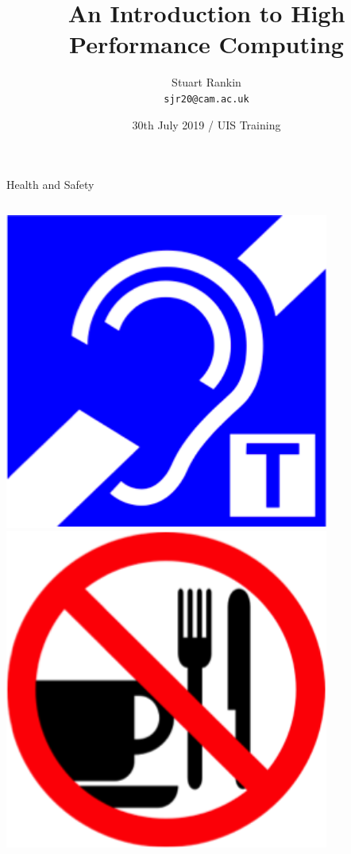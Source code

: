 \documentclass[handout]{beamer} %
\title[HPC: An introduction] %
{An Introduction to High Performance Computing}
\author[SJ Rankin] %
{Stuart Rankin\\ \texttt{sjr20@cam.ac.uk}}
\institute[Research Computing Services, University of Cambridge] %
{Research Computing Services (http://www.hpc.cam.ac.uk/)\\
University Information Services (http://www.uis.cam.ac.uk/)}
\date[30/07/2019] %
{30th July 2019 / UIS Training}
\begin{document}
\begin{frame}
  \titlepage
\end{frame}

\begin{frame}{Health and Safety}
\begin{columns}[c]
\begin{column}{0.33\textwidth}
\begin{center}
\includegraphics[width=0.8\textwidth,height=0.5\textheight,keepaspectratio]{imgs/health-safety-1.png}\\
\includegraphics[width=0.8\textwidth,height=0.5\textheight,keepaspectratio]{imgs/health-safety-4.png}

\end{center}
\end{column}
\end{columns}
\end{frame}
\end{document}

